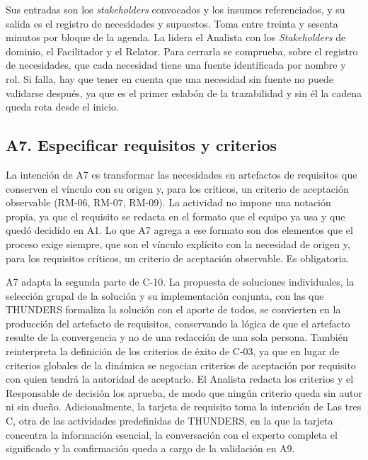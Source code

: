 \documentclass[12pt,letterpaper,oneside]{report}
\begin{document}
Sus entradas son los \textit{stakeholders} convocados y los insumos
referenciados, y su salida es el registro de necesidades y supuestos. Toma entre
treinta y sesenta minutos por bloque de la agenda. La lidera el Analista con
los \textit{Stakeholders} de dominio, el Facilitador y el Relator. Para cerrarla se
comprueba, sobre el registro de necesidades, que cada necesidad tiene una fuente
identificada por nombre y rol. Si falla, hay que tener en cuenta que una
necesidad sin fuente no puede validarse después, ya que es el primer eslabón de
la trazabilidad y sin él la cadena queda rota desde el inicio.

\subsection{A7. Especificar requisitos y criterios}
La intención de A7 es transformar las necesidades en artefactos de requisitos
que conserven el vínculo con su origen y, para los críticos, un criterio de
aceptación observable (RM-06, RM-07, RM-09). La actividad no impone una notación
propia, ya que el requisito se redacta en el formato que el equipo ya usa y que
quedó decidido en A1. Lo que A7 agrega a ese formato son dos elementos que el
proceso exige siempre, que son el vínculo explícito con la necesidad de origen y, para
los requisitos críticos, un criterio de aceptación observable. Es obligatoria.

A7 adapta la segunda parte de C-10. La propuesta de soluciones individuales, la
selección grupal de la solución y su implementación conjunta, con las que
THUNDERS formaliza la solución con el aporte de todos, se convierten en la
producción del artefacto de requisitos, conservando la lógica de que el
artefacto resulte de la convergencia y no de una redacción de una sola persona.
También reinterpreta la definición de los criterios de éxito de C-03, ya que en
lugar de criterios globales de la dinámica se negocian criterios de aceptación
por requisito con quien tendrá la autoridad de aceptarlo. El Analista redacta los
criterios y el Responsable de decisión los aprueba, de modo que ningún criterio
queda sin autor ni sin dueño. Adicionalmente, la tarjeta de requisito toma la
intención de Las tres C, otra de las actividades predefinidas de THUNDERS, en
la que la tarjeta concentra la información esencial, la conversación con el experto
completa el significado y la confirmación queda a cargo de la validación en A9.
\end{document}
